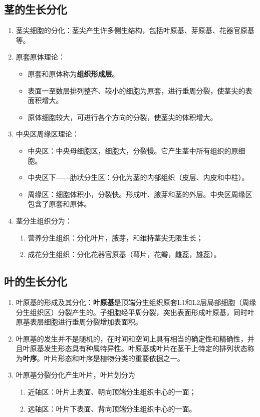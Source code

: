 \subsection{茎的生长分化}
\begin{enumerate}
    \item 茎尖细胞的分化：茎尖产生许多侧生结构，包括叶原基、芽原基、花器官原基等。
    \item 原套原体理论：
    \begin{itemize}
        \item 原套和原体称为\textbf{组织形成层}。
        \item 表面一至数层排列整齐、较小的细胞为原套，进行垂周分裂，使茎尖的表面积增大。
        \item 原体细胞较大，可进行各个方向的分裂，使茎尖的体积增大。
    \end{itemize}
    \item 中央区周缘区理论：
    \begin{itemize}
        \item 中央区：中央母细胞区，细胞大，分裂慢。它产生茎中所有组织的原细胞。
        \item 中央区下——肋状分生区：分化为茎的内部组织（皮层、内皮和中柱）。
        \item 周缘区：细胞体积小，分裂快。形成叶、腋芽和茎的外层。中央区周缘区包含了原套和原体。
    \end{itemize}
    \item 茎分生组织分为：
    \begin{enumerate}
        \item 营养分生组织：分化叶片，腋芽，和维持茎尖无限生长；
        \item 成花分生组织：分化花器官原基（萼片，花瓣，雌蕊，雄蕊）。
    \end{enumerate}
\end{enumerate}
\subsection{叶的生长分化}
\begin{enumerate}
    \item 叶原基的形成及其分化：\textbf{叶原基}是顶端分生组织原套L1和L2层局部细胞（周缘分生组织区）分裂产生的。子细胞经平周分裂，突出表面形成叶原基，同时叶原基表层细胞进行垂周分裂增加表面积。 
    \item 叶原基的发生并不是随机的，在时间和空间上具有相当的确定性和精确性，并且叶原基发生形态具有种属特异性。叶原基或叶片在茎干上特定的排列状态称为\textbf{叶序}。叶片形态和叶序是植物分类的重要依据之一。
    \item 叶原基分裂分化产生叶片，叶片划分为
    \begin{enumerate}
        \item 近轴区：叶片上表面、朝向顶端分生组织中心的一面；
        \item 远轴区：叶片下表面、背向顶端分生组织中心的一面。        
    \end{enumerate}
\end{enumerate}

